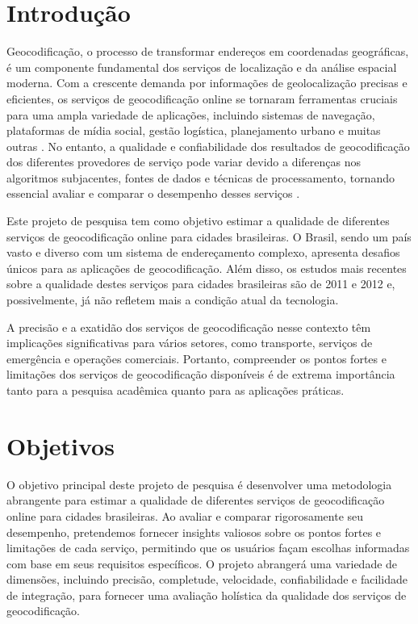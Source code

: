 \documentclass{article}
\begin{document}
\section{Introdução}
	
Geocodificação, o processo de transformar endereços em coordenadas geográficas, é um componente fundamental dos serviços de localização e da análise espacial moderna. Com a crescente demanda por informações de geolocalização precisas e eficientes, os serviços de geocodificação online se tornaram ferramentas cruciais para uma ampla variedade de aplicações, incluindo sistemas de navegação, plataformas de mídia social, gestão logística, planejamento urbano e muitas outras \cite{kilic2020accuracy,cortes2021improving}. No entanto, a qualidade e confiabilidade dos resultados de geocodificação dos diferentes provedores de serviço pode variar devido a diferenças nos algoritmos subjacentes, fontes de dados e técnicas de processamento, tornando essencial avaliar e comparar o desempenho desses serviços \cite{cetl2018comparison,kilic2020accuracy,pietro2017online}. 

Este projeto de pesquisa tem como objetivo estimar a qualidade de diferentes serviços de geocodificação online para cidades brasileiras. O Brasil, sendo um país vasto e diverso com um sistema de endereçamento complexo, apresenta desafios únicos para as aplicações de geocodificação. Além disso, os estudos mais recentes  sobre a qualidade destes serviços para cidades brasileiras são de 2011 e 2012 \cite{davis2011evaluation,martins2012geocodificacao} e, possivelmente, já não refletem mais a condição atual da tecnologia.   

A precisão e a exatidão dos serviços de geocodificação nesse contexto têm implicações significativas para vários setores, como transporte, serviços de emergência e operações comerciais. Portanto, compreender os pontos fortes e limitações dos serviços de geocodificação disponíveis é de extrema importância tanto para a pesquisa acadêmica quanto para as aplicações práticas.	
   
\section{Objetivos}

O objetivo principal deste projeto de pesquisa é desenvolver uma metodologia abrangente para estimar a qualidade de diferentes serviços de geocodificação online para cidades brasileiras. Ao avaliar e comparar rigorosamente seu desempenho, pretendemos fornecer insights valiosos sobre os pontos fortes e limitações de cada serviço, permitindo que os usuários façam escolhas informadas com base em seus requisitos específicos. O projeto abrangerá uma variedade de dimensões, incluindo precisão, completude, velocidade, confiabilidade e facilidade de integração, para fornecer uma avaliação holística da qualidade dos serviços de geocodificação.
   
\end{document}
